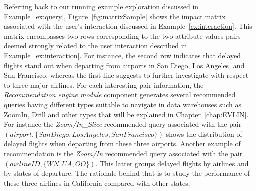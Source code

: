 \begin{example} 
\label{ex:sampleMatrix}
Referring back to our running example exploration discussed in Example~\ref{ex:query}, Figure~\ref{fig:matrixSample} shows the impact matrix associated with the user's interaction discussed in Example~\ref{ex:interaction}.
This matrix encompasses two rows corresponding to the two attribute-values pairs deemed strongly related to the user interaction described in Example~\ref{ex:interaction}. 
For instance, the second row indicates that delayed flights stand out when departing from airports in San Diego, Los Angeles, and San Francisco, whereas the first line suggests to further investigate with respect to three major airlines. 
For each interesting pair information, the \emph{Recommendation engine module} component generates several recommended queries having different types suitable to navigate in data warehouses such as ZoomIn, Drill and other types that will be explained in Chapter~\ref{chap:EVLIN}. 
For instance the \emph{Zoom/In\_Slice} recommended query associated with the pair $(airport, \{San Diego, Los Angeles, San Francisco\})$ shows the distribution of delayed flights when departing from these three airports.
Another example of recommendation is the \emph{Zoom/In} recommended query associated with the pair $(airlineID, \{WN,UA,OO\})$. This latter groups delayed flights by airlines and by states of departure. The rationale behind that is to study the performance of these three airlines in California compared with other states.
\end{example}



